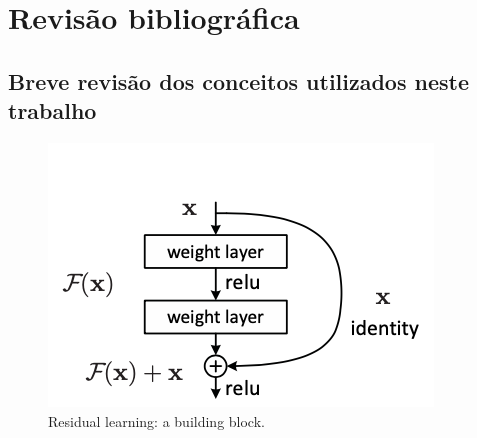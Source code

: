\chapter{Revisão bibliográfica} \label{chap:revBibli}
	\section{Breve revisão dos conceitos utilizados neste trabalho}


		\begin{figure}
			\centering
			\includegraphics[width=0.7\linewidth]{images/ResidualLearnningBuildBlock}
			\caption[Residual learning: a building block.]{Residual learning: a building block.}
			\label{fig:residuallearnningbuildblock}
		\end{figure}
	
